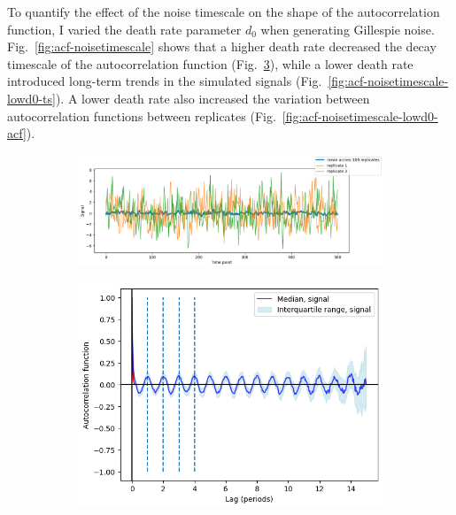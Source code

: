 To quantify the effect of the noise timescale on the shape of the autocorrelation function, I varied the death rate parameter $d_{0}$ when generating Gillespie noise.
Fig.\ \ref{fig:acf-noisetimescale} shows that a higher death rate decreased the decay timescale of the autocorrelation function (Fig.\ \ref{fig:acf-noisetimescale-highd0-acf}), while a lower death rate introduced long-term trends in the simulated signals (Fig.\ \ref{fig:acf-noisetimescale-lowd0-ts}).
A lower death rate also increased the variation between autocorrelation functions between replicates (Fig.\ \ref{fig:acf-noisetimescale-lowd0-acf}).

\begin{figure}
  \centering
  \begin{subfigure}[t]{0.6\textwidth}
  \centering
    \includegraphics[width=\linewidth]{gillespie_k5_d0p5_mean.png}
    \caption{
    }
    \label{fig:acf-noisetimescale-highd0-ts}
  \end{subfigure}%
  \begin{subfigure}[t]{0.4\textwidth}
  \centering
    \includegraphics[width=\linewidth]{gillespie_k5_d0p5_acf.png}
    \caption{
    }
    \label{fig:acf-noisetimescale-highd0-acf}
  \end{subfigure}


\end{figure}
